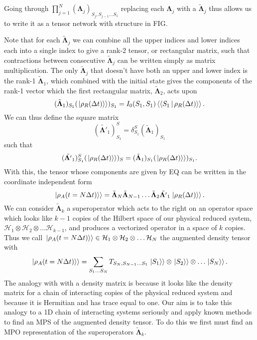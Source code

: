 \documentclass[a4paper, aps, pra,twocolumn]{revtex4-1}
\newcommand{\dket}[1]{\left.\Ket{#1}\right\rangle}
\newcommand{\dbraket}[1]{\left\langle\Braket{#1}\right\rangle}
\begin{document}
Going through $\prod_{j=1}^{N}(\mathbf{\Lambda}_j)_{S_j, S_{j-1} \ldots S_{1}}$ replacing each $\mathbf{\Lambda}_j$ with a $\tilde{\mathbf{\Lambda}}_j$ thus allows us to write it as a tensor network with structure in FIG. 

Note that for each $\tilde{\mathbf{\Lambda}}_j$ we can combine all the upper indices and lower indices each into a single index to give a rank-2 tensor, or rectangular matrix, such that contractions between consecutive $\tilde{\mathbf{\Lambda}}_j$ can be written simply as matrix multiplication. The only $\tilde{\mathbf{\Lambda}}_j$ that doesn't have both an upper and lower index is the rank-1 $\tilde{\mathbf{\Lambda}}_1$, which combined with the initial state gives the components of the  rank-1 vector which the first rectangular matrix, $\tilde{\mathbf{\Lambda}}_2$, acts upon
\begin{equation}
 (\tilde{\mathbf{\Lambda}}_1)_{S_1}(\dket{\rho_R(\Delta t)})_{S_1}=I_0(S_1,S_1)\dbraket{S_1 |\rho_R(\Delta t)}.
\end{equation}
We can thus define the square matrix
\begin{equation}
 (\tilde{\mathbf{\Lambda'}}_1)_{S_1}^S=\delta_{S_1}^S (\tilde{\mathbf{\Lambda}}_1)_{S_1}
\end{equation}
such that
\begin{equation}
 (\tilde{\mathbf{\Lambda'}}_1)_{S_1}^S(\dket{\rho_R(\Delta t)})_{S}=(\tilde{\mathbf{\Lambda}}_1)_{S_1}(\dket{\rho_R(\Delta t)})_{S_1}.
\end{equation}
With this, the tensor whose components are given by EQ can be written in the coordinate independent form
\begin{equation}
\dket{\rho_A(t=N\Delta t)}= \tilde{\mathbf{\Lambda}}_N \tilde{\mathbf{\Lambda}}_{N-1} \ldots \tilde{\mathbf{\Lambda}}_{2}\tilde{\mathbf{\Lambda'}}_{1}\dket{\rho_R(\Delta t)}.
\end{equation}
We can consider $\tilde{\mathbf{\Lambda}}_{k}$ a superoperator which acts to the right on an operator space which looks like $k-1$ copies of the Hilbert space of our physical reduced system, $\mathcal{H}_1 \otimes \mathcal{H}_2 \otimes \ldots \mathcal{H}_{k-1} $, and produces a vectorized operator in a space of $k$ copies. Thus we call $\dket{\rho_A(t=N\Delta t)} \in \mathcal{H}_1 \otimes \mathcal{H}_2 \otimes \ldots \mathcal{H}_{N}$ the augmented density tensor with
\begin{equation}
\dket{\rho_A(t=N\Delta t)}= \sum_{S_1...S_N} T_{S_N, S_{N-1} \ldots S_1 }\dket{S_1}\otimes \dket{S_2} \otimes \ldots \dket{S_N}.
\end{equation}
The analogy with with a density matrix is because it looks like the density matrix for a chain of interacting copies of the physical reduced system and because it is Hermitian and has trace equal to one.
Our aim is to take this analogy to a 1D chain of interacting systems seriously and apply known methods to find an MPS of the augmented density tensor.
To do this we first must find an MPO representation of the superoperators $\tilde{\mathbf{\Lambda}}_{k}$.
\end{document}
